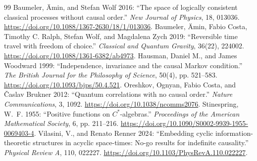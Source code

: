 \documentclass[11pt]{article}
\begin{document}
\begin{thebibliography}{99}
Baumeler, {\"A}min, and Stefan Wolf 2016: ``The space of logically consistent classical processes without causal order.'' \emph{New Journal of Physics}, 18, 013036. \url{https://doi.org/10.1088/1367-2630/18/1/013036}.
Baumeler, {\"A}min, Fabio Costa, Timothy C. Ralph, Stefan Wolf, and Magdalena Zych 2019: ``Reversible time travel with freedom of choice.'' \emph{Classical and Quantum Gravity}, 36(22), 224002. \url{https://doi.org/10.1088/1361-6382/ab4973}.
Hausman, Daniel M., and James Woodward 1999: ``Independence, invariance and the causal {M}arkov condition.'' \emph{The British Journal for the Philosophy of Science}, 50(4), pp. 521--583. \url{https://doi.org/10.1093/bjps/50.4.521}.
Oreshkov, Ognyan, Fabio Costa, and {\v C}aslav Brukner 2012: ``Quantum correlations with no causal order.'' \emph{Nature Communications}, 3, 1092. \url{https://doi.org/10.1038/ncomms2076}.
Stinespring, W.~F. 1955: ``Positive functions on {$C^{*}$}-algebras.'' \emph{Proceedings of the American Mathematical Society}, 6, pp. 211--216. \url{https://doi.org/10.1090/S0002-9939-1955-0069403-4}.
Vilasini, V., and Renato Renner 2024: ``Embedding cyclic information-theoretic structures in acyclic space-times: No-go results for indefinite causality.'' \emph{Physical Review A}, 110, 022227. \url{https://doi.org/10.1103/PhysRevA.110.022227}.
\end{thebibliography}
\end{document}
